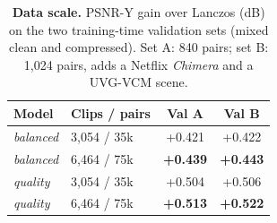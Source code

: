 \begin{table}[t]
\centering
\caption{\textbf{Data scale.} PSNR-Y gain over Lanczos (dB) on the two training-time validation sets (mixed clean and compressed). Set A: 840 pairs; set B: 1{,}024 pairs, adds a Netflix \emph{Chimera} and a UVG-VCM scene.}
\label{tab:ablation}
\begin{tabular}{llcc}
\toprule
Model & Clips / pairs & Val A & Val B \\
\midrule
\emph{balanced} & 3,054 / 35k & +0.421 & +0.422 \\
\emph{balanced} & 6,464 / 75k & \textbf{+0.439} & \textbf{+0.443} \\
\midrule
\emph{quality} & 3,054 / 35k & +0.504 & +0.506 \\
\emph{quality} & 6,464 / 75k & \textbf{+0.513} & \textbf{+0.522} \\
\bottomrule
\end{tabular}
\end{table}
